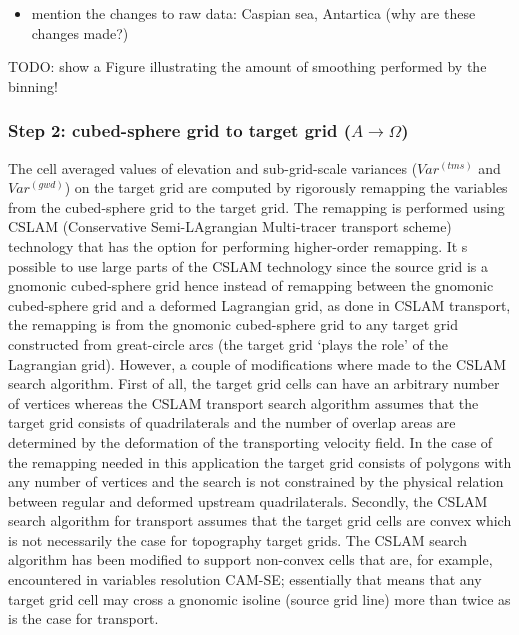 \documentclass[gmd]{copernicus}
\begin{document}
\begin{itemize}
\item mention the changes to raw data: Caspian sea, Antartica (why are these changes made?)
\end{itemize}

%
%
TODO: show a Figure illustrating the amount of smoothing performed by the binning!
%
\subsubsection{Step 2: cubed-sphere grid to target grid ($A\rightarrow \Omega$)}\label{sec:step2}
The cell averaged values of elevation and sub-grid-scale variances ($Var^{(tms)}$ and $Var^{(gwd)}$) on the target grid are computed by rigorously remapping the variables from the cubed-sphere grid to the target grid.  The remapping is performed using CSLAM (Conservative Semi-LAgrangian Multi-tracer transport scheme) technology \citep{LNU2010JCP} that has the option for performing higher-order remapping. It s possible to use large parts of the CSLAM technology since the source grid is a gnomonic cubed-sphere grid hence instead of remapping between the gnomonic cubed-sphere grid and a deformed Lagrangian grid, as done in CSLAM transport, the remapping is from the gnomonic cubed-sphere grid to any target grid constructed from great-circle arcs (the target grid `plays the role' of the Lagrangian grid). However, a couple of modifications where made to the CSLAM search algorithm. First of all, the target grid cells can have an arbitrary number of vertices whereas the CSLAM transport search algorithm assumes that the target grid consists of quadrilaterals and the number of overlap areas are determined by the deformation of the transporting velocity field. In the case of the remapping needed in this application the target grid consists of polygons with any number of vertices and the search is not constrained by the physical relation between regular and deformed upstream quadrilaterals. Secondly, the CSLAM search algorithm for transport assumes that the target grid cells are convex which is not necessarily the case for topography target grids. The CSLAM search algorithm has been modified to support non-convex cells that are, for example, encountered in variables resolution CAM-SE; essentially that means that any target grid cell may cross a gnonomic isoline (source grid line) more than twice as is the case for transport.
\end{document}
